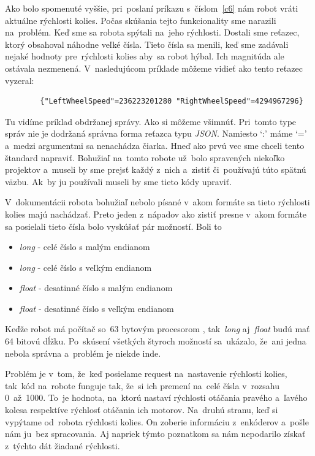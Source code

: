 Ako bolo spomenuté vyššie, pri~poslaní príkazu s~číslom~\ref{c6} nám robot vráti aktuálne rýchlosti kolies. Počas skúšania tejto funkcionality
sme narazili na~problém. Keď sme sa robota spýtali na~jeho rýchlosti. Dostali sme reťazec, ktorý obsahoval náhodne veľké čísla. Tieto čísla sa
menili, keď sme zadávali nejaké hodnoty pre~rýchlosti kolies aby~sa robot hýbal. Ich magnitúda ale ostávala nezmenená. V~nasledujúcom príklade
môžeme vidieť ako tento reťazec vyzeral:

\label{jsonWannabeSpeed}
\begin{lstlisting}
		{"LeftWheelSpeed"=236223201280 "RightWheelSpeed"=4294967296}
\end{lstlisting}

Tu vidíme príklad obdržanej správy. Ako si môžeme všimnúť. Pri~tomto type správ nie je dodržaná správna forma reťazca typu \textit{JSON}.
Namiesto `:' máme `=' a~medzi argumentmi sa nenachádza čiarka. Hneď ako prvú vec sme chceli tento štandard napraviť. Bohužiaľ na~tomto
robote už~bolo spravených niekoľko projektov a~museli by sme prejsť každý z~nich a~zistiť či~používajú túto spätnú väzbu. Ak~by ju používali
museli by sme tieto kódy upraviť.

V~dokumentácii robota bohužiaľ nebolo písané v~akom formáte sa tieto rýchlosti kolies majú nachádzať. Preto jeden z~nápadov ako zistiť presne
v~akom formáte sa posielali tieto čísla bolo vyskúšať pár možností. Boli to

\begin{itemize}
	\item \textit{long} - celé číslo s malým endianom
	\item \textit{long} - celé číslo s veľkým endianom
	\item \textit{float} - desatinné číslo s malým endianom
	\item \textit{float} - desatinné číslo s veľkým endianom
\end{itemize}

Keďže robot má počítač so~63 bytovým procesorom \cite{robotPc}, tak~\textit{long} aj~\textit{float} budú mať 64 bitovú dĺžku. Po~skúsení všetkých
štyroch možností sa~ukázalo, že~ani jedna nebola správna a~problém je niekde inde.

Problém je v~tom, že~keď posielame request na~nastavenie rýchlosti kolies, tak~kód na~robote funguje tak, že~si ich premení na~celé čísla v~rozsahu
0~až~1000. To~je hodnota, na~ktorú nastaví rýchlosti otáčania pravého a~ľavého kolesa respektíve rýchlosť otáčania ich motorov. Na~druhú stranu,
keď si vypýtame od~robota rýchlosti kolies. On zoberie informáciu z~enkóderov a~pošle nám ju~bez spracovania. Aj napriek týmto poznatkom sa nám
nepodarilo získať z~týchto dát žiadané rýchlosti.

